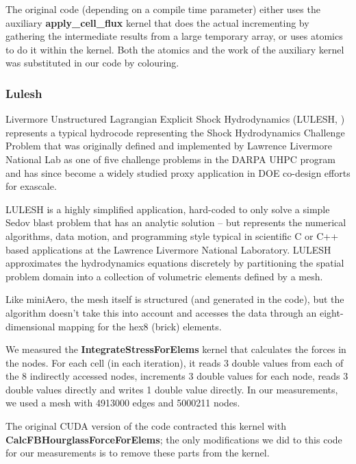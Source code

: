 The original code (depending on a compile time parameter) either uses the
auxiliary \textbf{apply\_cell\_flux} kernel that does the actual incrementing by
gathering the intermediate results from a large temporary array, or uses atomics
to do it within the kernel. Both the atomics and the work of the auxiliary
kernel was substituted in our code by colouring.

\subsubsection{Lulesh}\label{sec:lulesh-summary}


Livermore Unstructured Lagrangian Explicit Shock Hydrodynamics (LULESH,
\cite{LULESH2:changes}) represents a typical hydrocode representing the Shock
Hydrodynamics Challenge Problem that was originally defined and implemented by
Lawrence Livermore National Lab as one of five challenge problems in the DARPA
UHPC program and has since become a widely studied proxy application in DOE
co-design efforts for exascale. 

LULESH is a highly simplified application, hard-coded to only solve a simple
Sedov blast problem that has an analytic solution \cite{LULESH:spec} – but
represents the numerical algorithms, data motion, and programming style typical
in scientific C or C++ based applications at the Lawrence Livermore National
Laboratory. LULESH approximates the hydrodynamics equations discretely by
partitioning the spatial problem domain into a collection of volumetric elements
defined by a mesh.

Like miniAero, the mesh itself is structured (and generated in the code), but
the algorithm doesn't take this into account and accesses the data through an
eight-dimensional mapping for the hex8 (brick) elements.

We measured the \textbf{IntegrateStressForElems} kernel that calculates the
forces in the nodes. For each cell (in each iteration), it reads 3 double values
from each of the 8 indirectly accessed nodes, increments 3 double values for
each node, reads 3 double values directly and writes 1 double value directly. In
our measurements, we used a mesh with \num{4913000} edges and \num{5000211}
nodes.

The original CUDA version of the code contracted this kernel with
\textbf{CalcFBHourglassForceForElems}; the only modifications we did to this
code for our measurements is to remove these parts from the kernel.

